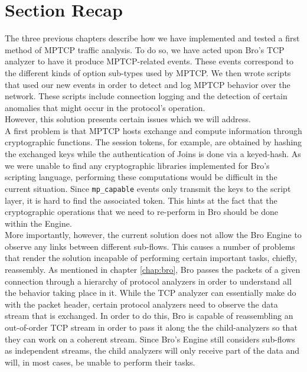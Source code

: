
\chapter{Section Recap} \label{chap:recap}

The three previous chapters describe how we have implemented and tested a first method of MPTCP traffic analysis. To do so, we have acted upon Bro's TCP analyzer to have it produce MPTCP-related events. These events correspond to the different kinds of option sub-types used by MPTCP. We then wrote scripts that used our new events in order to detect and log MPTCP behavior over the network. These scripts include connection logging and the detection of certain anomalies that might occur in the protocol's operation. \\ However, this solution presents certain issues which we will address.\\

A first problem is that MPTCP hosts exchange and compute information through cryptographic functions. The session tokens, for example, are obtained by hashing the exchanged keys while the authentication of Joins is done via a keyed-hash. As we were unable to find any cryptographic libraries implemented for Bro's scripting language, performing these computations would be difficult in the current situation. Since \texttt{mp\_capable} events only transmit the keys to the script layer, it is hard to find the associated token. This hints at the fact that the cryptographic operations that we need to re-perform in Bro should be done within the Engine.\\

More importantly, however, the current solution does not allow the Bro Engine to observe any links between different sub-flows. This causes a number of problems that render the solution incapable of performing certain important tasks, chiefly, reassembly. As mentioned in chapter \ref{chap:bro}, Bro passes the packets of a given connection through a hierarchy of protocol analyzers in order to understand all the behavior taking place in it. While the TCP analyzer can essentially make do with the packet header, certain protocol analyzers need to observe the data stream that is exchanged. In order to do this, Bro is capable of reassembling an out-of-order TCP stream in order to pass it along the the child-analyzers so that they can work on a coherent stream. Since Bro's Engine still considers sub-flows as independent streams, the child analyzers will only receive part of the data and will, in most cases, be unable to perform their tasks.\\

